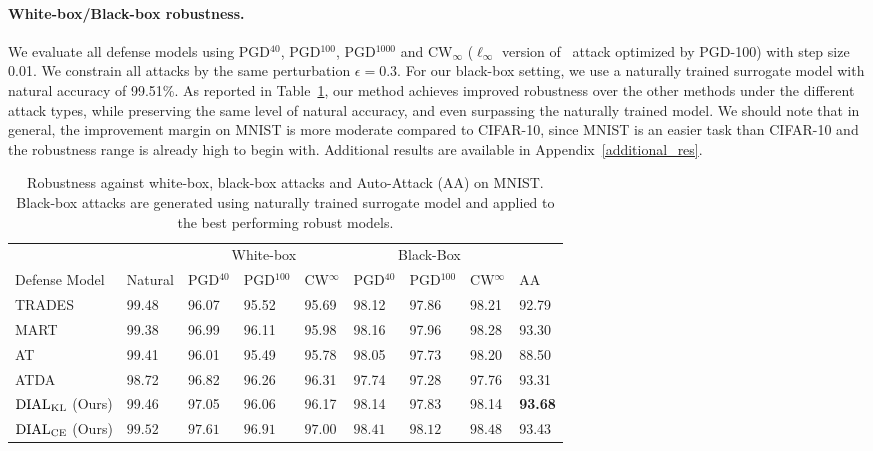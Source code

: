 \paragraph{White-box/Black-box robustness.} We evaluate all defense models using PGD$^{40}$, PGD$^{100}$, PGD$^{1000}$ and CW$_{\infty}$ ($\ell_{\infty}$ version of~\cite{carlini2017towards} attack optimized by PGD-100) with step size 0.01. We constrain all attacks by the same perturbation $\epsilon=0.3$. 
For our black-box setting, we use a naturally trained surrogate model with natural accuracy of 99.51\%. As reported in Table~\ref{black-and_white-mnist}, our method achieves improved robustness over the other methods under the different attack types, while preserving the same level of natural accuracy, and even surpassing the naturally trained model. We should note that in general, the improvement margin on MNIST is more moderate compared to CIFAR-10, since MNIST is an easier task than CIFAR-10 and the robustness range is already high to begin with. Additional results are available in Appendix~\ref{additional_res}.


\begin{table}[!ht]
  \caption{Robustness against white-box, black-box attacks and Auto-Attack (AA) on MNIST. Black-box attacks are generated using naturally trained surrogate model and applied to the best performing robust models.}
  \label{black-and_white-mnist}
  \vskip 0.15in
  \centering
  \begin{tabular}{lllllllll}
    \toprule
    & & \multicolumn{3}{c}{White-box} & \multicolumn{3}{c}{Black-Box} \\
    \cmidrule(r){3-5} 
    \cmidrule(r){6-8}
    Defense Model & Natural & PGD$^{40}$ & PGD$^{100}$ & CW$^{\infty}$ & PGD$^{40}$ & PGD$^{100}$ & CW$^{\infty}$ & AA \\
    \midrule
    TRADES & 99.48 & 96.07 & 95.52 & 95.69 & 98.12 & 97.86 & 98.21 & 92.79 \\
    MART & 99.38 & 96.99 & 96.11 & 95.98 & 98.16 & 97.96 & 98.28 & 93.30 \\
    AT & 99.41 & 96.01 & 95.49 & 95.78 & 98.05 & 97.73 & 98.20 & 88.50 \\
    ATDA & 98.72 & 96.82 & 96.26 & 96.31 & 97.74 & 97.28 & 97.76 & 93.31 \\
    $\operatorname{DIAL}_{\operatorname{KL}}$ (Ours)  & 99.46 & 97.05 & 96.06 & 96.17 & 98.14 & 97.83 & 98.14 & \textbf{93.68} \\
    $\operatorname{DIAL}_{\operatorname{CE}}$ (Ours)  & $\mathbf{99.52}$ & $\mathbf{97.61}$ & $\mathbf{96.91}$ & $\mathbf{97.00}$ & $\mathbf{98.41}$ & $\mathbf{98.12}$ & $\mathbf{98.48}$ & 93.43 \\
    \bottomrule
  \end{tabular}
\end{table}


